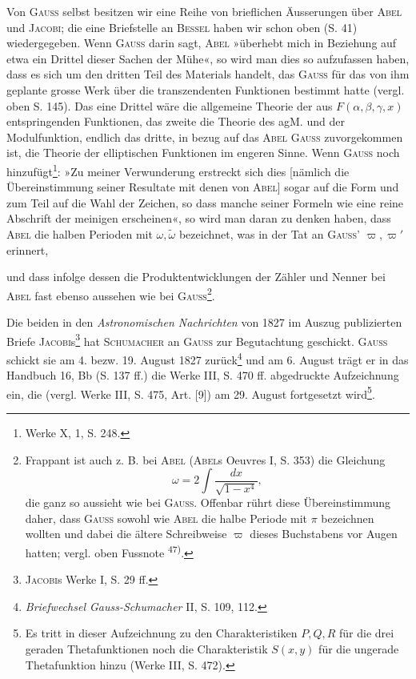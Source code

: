 Von \textsc{Gauss} selbst besitzen wir eine Reihe von brieflichen Äusserungen
über \textsc{Abel} und \textsc{Jacobi}; die eine Briefstelle an \textsc{Bessel} haben wir schon oben
(S. 41) wiedergegeben. Wenn \textsc{Gauss} darin sagt, \textsc{Abel} »überhebt mich in
Beziehung auf etwa ein Drittel dieser Sachen der Mühe«, so wird man
dies so aufzufassen haben, dass es sich um den dritten Teil des Materials
handelt, das \textsc{Gauss} für das von ihm geplante grosse Werk über die transzendenten
Funktionen bestimmt hatte (vergl. oben S. 145). Das eine Drittel
wäre die allgemeine Theorie der aus \(F(\alpha,\beta,\gamma,x)\) entspringenden Funktionen,
das zweite die Theorie des agM. und der Modulfunktion, endlich das
dritte, in bezug auf das \textsc{Abel} \textsc{Gauss} zuvorgekommen ist, die Theorie der
elliptischen Funktionen im engeren Sinne. Wenn \textsc{Gauss} noch hinzufügt\footnote{Werke X, 1, S. 248.}:
»Zu meiner Verwunderung erstreckt sich dies [nämlich die Übereinstimmung
seiner Resultate mit denen von \textsc{Abel}] sogar auf die Form und zum Teil auf
die Wahl der Zeichen, so dass manche seiner Formeln wie eine reine Abschrift
der meinigen erscheinen«, so wird man daran zu denken haben, dass \textsc{Abel}
die halben Perioden mit \(\omega,\tilde\omega\) bezeichnet, was in der Tat an \textsc{Gauss}' \(\varpi,\varpi'\) erinnert,
\par\clearpage{}
\noindent und dass infolge dessen die Produktentwicklungen der Zähler und
Nenner bei \textsc{Abel} fast ebenso aussehen wie bei \textsc{Gauss}\footnote{Frappant ist auch z. B. bei \textsc{Abel} (\textsc{Abel}s Oeuvres I, S. 353) die Gleichung
\[
\omega=2\int\frac{dx}{\sqrt{1-x^4}},
\]
die ganz so aussieht wie bei \textsc{Gauss}. Offenbar rührt diese Übereinstimmung daher, dass \textsc{Gauss} sowohl wie
\textsc{Abel} die halbe Periode mit \(\pi\) bezeichnen wollten und dabei die ältere Schreibweise \(\varpi\) dieses Buchstabens
vor Augen hatten; vergl. oben Fussnote \textsuperscript{47)}.}.

Die beiden in den \textit{Astronomischen Nachrichten} von 1827 im Auszug
publizierten Briefe \textsc{Jacobi}s\footnote{\textsc{Jacobi}s Werke I, S. 29 ff.} hat \textsc{Schumacher} an \textsc{Gauss} zur Begutachtung
geschickt. \textsc{Gauss} schickt sie am 4. bezw. 19. August 1827 zurück\footnote{\textit{Briefwechsel Gauss-Schumacher} II, S. 109, 112.} und am
6. August trägt er in das Handbuch 16, Bb (S. 137 ff.) die Werke III, S. 470 ff.
abgedruckte Aufzeichnung ein, die (vergl. Werke III, S. 475, Art. [9]) am
29. August fortgesetzt wird\footnote{Es tritt in dieser Aufzeichnung zu den Charakteristiken \(P,Q,R\) für die drei geraden Thetafunktionen noch die Charakteristik \(S(x,y)\) für die ungerade Thetafunktion hinzu (Werke III, S. 472).}.

